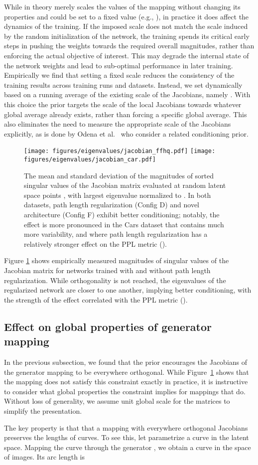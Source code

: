 \documentclass[10pt,twocolumn,letterpaper]{article}
\newcommand{\figeigenvalues}{
\begin{figure}[t]
\texttt{[image: figures/eigenvalues/jacobian\_ffhq.pdf]}\hfill
\texttt{[image: figures/eigenvalues/jacobian\_car.pdf]}
\caption{
The mean and standard deviation of the magnitudes of sorted singular values of the Jacobian matrix evaluated at random latent space points , with largest eigenvalue normalized to . In both datasets, path length regularization (Config D) and novel architecture (Config F) exhibit better conditioning; notably, the effect is more pronounced in the Cars dataset that contains much more variability, and where path length regularization has a relatively stronger effect on the PPL metric (\reftabmain{}).
}
\label{fig:eigenvalues}
\end{figure}
}
\begin{document}
While in theory  merely scales the values of the mapping without changing its properties and could be set to a fixed value (e.g., ), in practice it does affect the dynamics of the training. If the imposed scale does not match the scale induced by the random initialization of the network, the training spends its critical early steps in pushing the weights towards the required overall magnitudes, rather than enforcing the actual objective of interest. This may degrade the internal state of the network weights and lead to sub-optimal performance in later training. Empirically we find that setting a fixed scale reduces the consistency of the training results across training runs and datasets. Instead, we set  dynamically based on a running average of the existing scale of the Jacobians, namely . With this choice the prior targets the scale of the local Jacobians towards whatever global average already exists, rather than forcing a specific global average. This also eliminates the need to measure the appropriate scale of the Jacobians explicitly, as is done by Odena et al.~\cite{Odena2018} who consider a related conditioning prior.

\figeigenvalues

Figure \ref{fig:eigenvalues} shows empirically measured magnitudes of singular values of the Jacobian matrix for networks trained with and without path length regularization. While orthogonality is not reached, the eigenvalues of the regularized network are closer to one another, implying better conditioning, with the strength of the effect correlated with the PPL metric ().

\subsection{Effect on global properties of generator mapping}
In the previous subsection, we found that the prior encourages the Jacobians of the generator mapping to be everywhere orthogonal. While Figure~\ref{fig:eigenvalues} shows that the mapping does not satisfy this constraint exactly in practice, it is instructive to consider what global properties the constraint implies for mappings that do.  Without loss of generality, we assume unit global scale for the matrices to simplify the presentation.

The key property is that that a mapping  with everywhere orthogonal Jacobians preserves the lengths of curves. To see this, let  parametrize a curve in the latent space. Mapping the curve through the generator , we obtain a curve  in the space of images. Its arc length is
\end{document}
